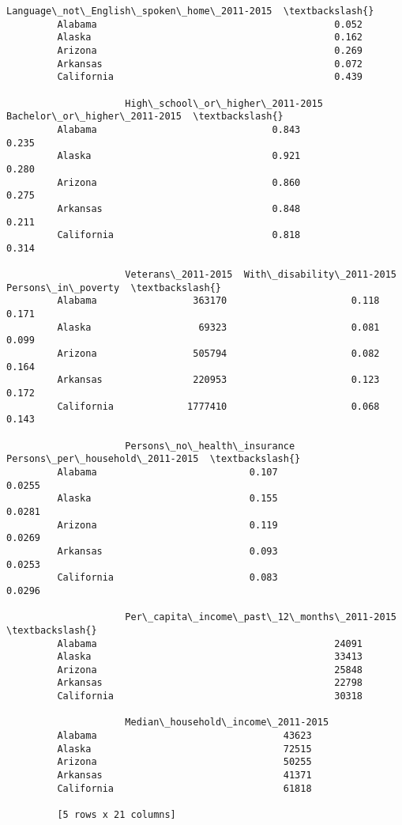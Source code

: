 \documentclass[11pt]{article}
\begin{document}
\begin{Verbatim}[commandchars=\\\{\}]
                     Language\_not\_English\_spoken\_home\_2011-2015  \textbackslash{}
         Alabama                                          0.052   
         Alaska                                           0.162   
         Arizona                                          0.269   
         Arkansas                                         0.072   
         California                                       0.439   
         
                     High\_school\_or\_higher\_2011-2015  Bachelor\_or\_higher\_2011-2015  \textbackslash{}
         Alabama                               0.843                         0.235   
         Alaska                                0.921                         0.280   
         Arizona                               0.860                         0.275   
         Arkansas                              0.848                         0.211   
         California                            0.818                         0.314   
         
                     Veterans\_2011-2015  With\_disability\_2011-2015  Persons\_in\_poverty  \textbackslash{}
         Alabama                 363170                      0.118               0.171   
         Alaska                   69323                      0.081               0.099   
         Arizona                 505794                      0.082               0.164   
         Arkansas                220953                      0.123               0.172   
         California             1777410                      0.068               0.143   
         
                     Persons\_no\_health\_insurance  Persons\_per\_household\_2011-2015  \textbackslash{}
         Alabama                           0.107                           0.0255   
         Alaska                            0.155                           0.0281   
         Arizona                           0.119                           0.0269   
         Arkansas                          0.093                           0.0253   
         California                        0.083                           0.0296   
         
                     Per\_capita\_income\_past\_12\_months\_2011-2015  \textbackslash{}
         Alabama                                          24091   
         Alaska                                           33413   
         Arizona                                          25848   
         Arkansas                                         22798   
         California                                       30318   
         
                     Median\_household\_income\_2011-2015  
         Alabama                                 43623  
         Alaska                                  72515  
         Arizona                                 50255  
         Arkansas                                41371  
         California                              61818  
         
         [5 rows x 21 columns]
\end{Verbatim}
            
\end{document}

